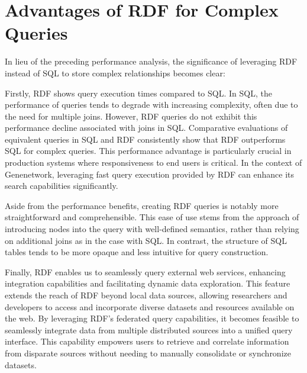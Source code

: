 \section{Advantages of RDF for Complex Queries}

In lieu of the preceding performance analysis, the significance of leveraging RDF instead of SQL to store complex relationships becomes clear:

Firstly, RDF shows query execution times compared to SQL. In SQL, the performance of queries tends to degrade with increasing complexity, often due to the need for multiple joins. However, RDF queries do not exhibit this performance decline associated with joins in SQL. Comparative evaluations of equivalent queries in SQL and RDF consistently show that RDF outperforms SQL for complex queries. This performance advantage is particularly crucial in production systems where responsiveness to end users is critical. In the context of Genenetwork, leveraging fast query execution provided by RDF can enhance its search capabilities significantly.

Aside from the performance benefits, creating RDF queries is notably more straightforward and comprehensible. This ease of use stems from the approach of introducing nodes into the query with well-defined semantics, rather than relying on additional joins as in the case with SQL.  In contrast, the structure of SQL tables tends to be more opaque and less intuitive for query construction.


Finally, RDF enables us to seamlessly query external web services, enhancing integration capabilities and facilitating dynamic data exploration. This feature extends the reach of RDF beyond local data sources, allowing researchers and developers to access and incorporate diverse datasets and resources available on the web. By leveraging RDF's federated query capabilities, it becomes feasible to seamlessly integrate data from multiple distributed sources into a unified query interface. This capability empowers users to retrieve and correlate information from disparate sources without needing to manually consolidate or synchronize datasets.
